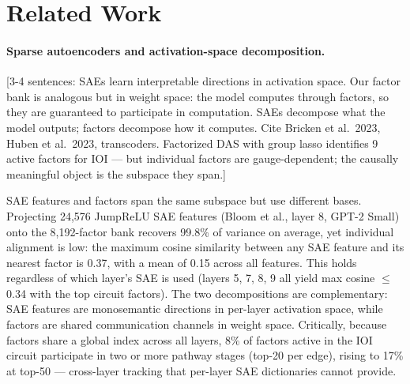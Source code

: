 \documentclass[11pt]{article}
\begin{document}

\section{Related Work}



\paragraph{Sparse autoencoders and activation-space decomposition.}
[3-4 sentences: SAEs learn interpretable directions in activation space.
Our factor bank is analogous but in weight space: the model computes
through factors, so they are guaranteed to participate in computation.
SAEs decompose what the model outputs; factors decompose how it computes.
Cite Bricken et al.\ 2023, Huben et al.\ 2023, transcoders.
Factorized DAS with group lasso identifies 9 active factors for IOI
--- but individual factors are gauge-dependent; the causally meaningful
object is the subspace they span.]


SAE features and factors span the same subspace but use different bases.
Projecting 24,576 JumpReLU SAE features (Bloom et al., layer 8, GPT-2
Small) onto the 8,192-factor bank recovers 99.8\% of variance on
average, yet individual alignment is low: the maximum cosine similarity
between any SAE feature and its nearest factor is 0.37, with a mean of
0.15 across all features. This holds regardless of which layer's SAE is
used (layers 5, 7, 8, 9 all yield max cosine $\leq$0.34 with the top
circuit factors). The two decompositions are complementary: SAE features
are monosemantic directions in per-layer activation space, while factors
are shared communication channels in weight space. Critically, because
factors share a global index across all layers, 8\% of factors active in
the IOI circuit participate in two or more pathway stages (top-20 per
edge), rising to 17\% at top-50 --- cross-layer tracking that per-layer
SAE dictionaries cannot provide.
\end{document}
